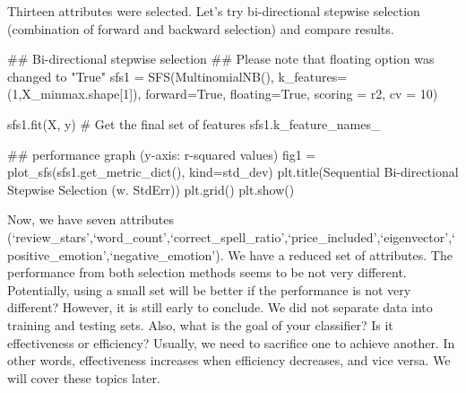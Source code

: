 \documentclass[
  letterpaper,
]{scrbook}
\newenvironment{Shaded}{\begin{snugshade}}{\end{snugshade}}
\newcommand{\CommentTok}[1]{\textcolor[rgb]{0.37,0.37,0.37}{#1}}
\newcommand{\DecValTok}[1]{\textcolor[rgb]{0.68,0.00,0.00}{#1}}
\newcommand{\NormalTok}[1]{\textcolor[rgb]{0.00,0.23,0.31}{#1}}
\newcommand{\OperatorTok}[1]{\textcolor[rgb]{0.37,0.37,0.37}{#1}}
\newcommand{\StringTok}[1]{\textcolor[rgb]{0.13,0.47,0.30}{#1}}
\newcommand{\VariableTok}[1]{\textcolor[rgb]{0.07,0.07,0.07}{#1}}
\begin{document}
Thirteen attributes were selected. Let's try bi-directional stepwise
selection (combination of forward and backward selection) and compare
results.

\begin{Shaded}
\begin{Highlighting}[]
\CommentTok{\#\# Bi{-}directional stepwise selection}
\CommentTok{\#\# Please note that floating option was changed to "True"}
\NormalTok{sfs1 }\OperatorTok{=}\NormalTok{ SFS(MultinomialNB(),}
\NormalTok{           k\_features}\OperatorTok{=}\NormalTok{(}\DecValTok{1}\NormalTok{,X\_minmax.shape[}\DecValTok{1}\NormalTok{]),}
\NormalTok{           forward}\OperatorTok{=}\VariableTok{True}\NormalTok{, }
\NormalTok{           floating}\OperatorTok{=}\VariableTok{True}\NormalTok{,}
\NormalTok{           scoring }\OperatorTok{=} \StringTok{\textquotesingle{}r2\textquotesingle{}}\NormalTok{,}
\NormalTok{           cv }\OperatorTok{=} \DecValTok{10}\NormalTok{)}

\NormalTok{sfs1.fit(X, y)}
\CommentTok{\# Get the final set of features}
\NormalTok{sfs1.k\_feature\_names\_     }
\end{Highlighting}
\end{Shaded}

\begin{Shaded}
\begin{Highlighting}[]
\CommentTok{\#\# performance graph (y{-}axis: r{-}squared values)}
\NormalTok{fig1 }\OperatorTok{=}\NormalTok{ plot\_sfs(sfs1.get\_metric\_dict(), kind}\OperatorTok{=}\StringTok{\textquotesingle{}std\_dev\textquotesingle{}}\NormalTok{)}
\NormalTok{plt.title(}\StringTok{\textquotesingle{}Sequential Bi{-}directional Stepwise Selection (w. StdErr)\textquotesingle{}}\NormalTok{)}
\NormalTok{plt.grid()}
\NormalTok{plt.show()}
\end{Highlighting}
\end{Shaded}

Now, we have seven attributes
(`review\_stars',`word\_count',`correct\_spell\_ratio',`price\_included',`eigenvector',`positive\_emotion',`negative\_emotion').
We have a reduced set of attributes. The performance from both selection
methods seems to be not very different. Potentially, using a small set
will be better if the performance is not very different? However, it is
still early to conclude. We did not separate data into training and
testing sets. Also, what is the goal of your classifier? Is it
effectiveness or efficiency? Usually, we need to sacrifice one to
achieve another. In other words, effectiveness increases when efficiency
decreases, and vice versa. We will cover these topics later.
\end{document}
